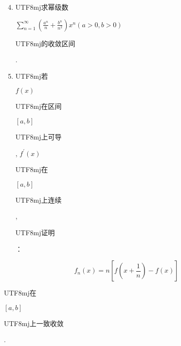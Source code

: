\documentclass[10pt]{article}
\begin{document}
\begin{enumerate}
  \setcounter{enumi}{3}
  \item \begin{CJK}{UTF8}{mj}求幂级数\end{CJK} $\sum_{n=1}^{\infty}\left(\frac{a^{n}}{n}+\frac{b^{n}}{n^{2}}\right) x^{n}(a>0, b>0)$ \begin{CJK}{UTF8}{mj}的收敛区间\end{CJK}.

  \item \begin{CJK}{UTF8}{mj}若\end{CJK} $f(x)$ \begin{CJK}{UTF8}{mj}在区间\end{CJK} $[a, b]$ \begin{CJK}{UTF8}{mj}上可导\end{CJK}, $f^{\prime}(x)$ \begin{CJK}{UTF8}{mj}在\end{CJK} $[a, b]$ \begin{CJK}{UTF8}{mj}上连续\end{CJK}, \begin{CJK}{UTF8}{mj}证明\end{CJK}：

\end{enumerate}
$$
f_{n}(x)=n\left[f\left(x+\frac{1}{n}\right)-f(x)\right]
$$
\begin{CJK}{UTF8}{mj}在\end{CJK} $[a, b]$ \begin{CJK}{UTF8}{mj}上一致收敛\end{CJK}.
\end{document}
